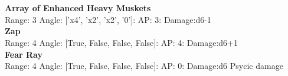 \ \\

\ \\
{\bf Array of Enhanced Heavy Muskets } \\



Range: 3  Angle: ['x4', 'x2', 'x2', '0']: AP: 3: Damage:d6-1 \\




{\bf Zap } \\



Range: 4  Angle: [True, False, False, False]: AP: 4: Damage:d6+1 \\




{\bf Fear Ray } \\



Range: 4  Angle: [True, False, False, False]: AP: 0: Damage:d6 Psycic damage \\




 
\ \\





